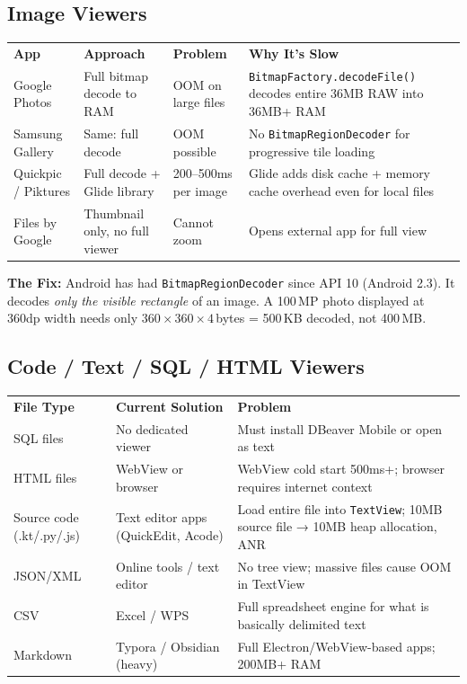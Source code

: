 \documentclass[12pt,a4paper]{report}
\newcommand{\ra}[1]{\renewcommand{\arraystretch}{#1}}
\newcommand{\TH}[1]{\rowcolor{P1}\color{white}\bfseries #1}
\begin{document}
\subsection{Image Viewers}

\begin{center}\ra{1.35}
\begin{tabular}{L{3.2cm} L{3.4cm} L{2.0cm} L{5.2cm}}
\TH{App} & \TH{Approach} & \TH{Problem} & \TH{Why It's Slow} \\
 Google Photos & Full bitmap decode to RAM & OOM on large files &
  \texttt{BitmapFactory.decodeFile()} decodes entire 36MB RAW into 36MB+ RAM \\
 Samsung Gallery & Same: full decode & OOM possible &
  No \texttt{BitmapRegionDecoder} for progressive tile loading \\
 Quickpic / Piktures & Full decode + Glide library & 200--500ms per image &
  Glide adds disk cache + memory cache overhead even for local files \\
 Files by Google & Thumbnail only, no full viewer & Cannot zoom & Opens external app for full view \\
\end{tabular}
\end{center}

\textbf{The Fix:} Android has had \texttt{BitmapRegionDecoder} since API 10
(Android 2.3). It decodes \emph{only the visible rectangle} of an image. A
100\,MP photo displayed at 360dp width needs only $360 \times 360 \times 4$\,bytes
= 500\,KB decoded, not 400\,MB.

\subsection{Code / Text / SQL / HTML Viewers}

\begin{center}\ra{1.35}
\begin{tabular}{L{3.0cm} L{3.2cm} L{5.6cm}}
\TH{File Type} & \TH{Current Solution} & \TH{Problem} \\
 SQL files & No dedicated viewer & Must install DBeaver Mobile or open as text \\
 HTML files & WebView or browser & WebView cold start 500ms+; browser requires internet context \\
 Source code (.kt/.py/.js) & Text editor apps (QuickEdit, Acode) &
  Load entire file into \texttt{TextView}; 10MB source file → 10MB heap allocation, ANR \\
 JSON/XML & Online tools / text editor & No tree view; massive files cause OOM in TextView \\
 CSV & Excel / WPS & Full spreadsheet engine for what is basically delimited text \\
 Markdown & Typora / Obsidian (heavy) & Full Electron/WebView-based apps; 200MB+ RAM \\
\end{tabular}
\end{center}
\end{document}
